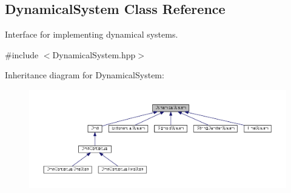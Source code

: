 \hypertarget{classDmpBbo_1_1DynamicalSystem}{\subsection{Dynamical\+System Class Reference}
\label{classDmpBbo_1_1DynamicalSystem}
}


Interface for implementing dynamical systems.  




{\ttfamily \#include $<$Dynamical\+System.\+hpp$>$}



Inheritance diagram for Dynamical\+System\+:
\nopagebreak
\begin{figure}[H]
\begin{center}
\leavevmode
\includegraphics[width=350pt]{classDmpBbo_1_1DynamicalSystem__inherit__graph}
\end{center}
\end{figure}
